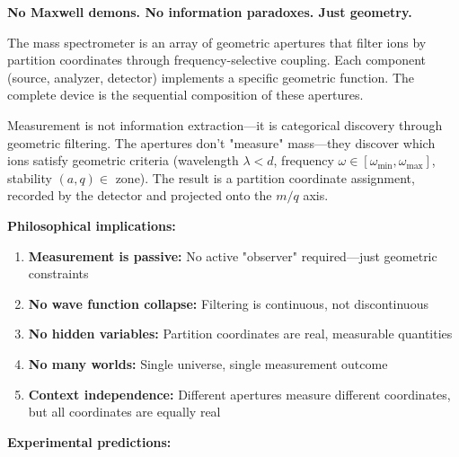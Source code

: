 \textbf{No Maxwell demons. No information paradoxes. Just geometry.}

The mass spectrometer is an array of geometric apertures that filter ions by partition coordinates through frequency-selective coupling. Each component (source, analyzer, detector) implements a specific geometric function. The complete device is the sequential composition of these apertures.

Measurement is not information extraction—it is categorical discovery through geometric filtering. The apertures don't "measure" mass—they discover which ions satisfy geometric criteria (wavelength $\lambda < d$, frequency $\omega \in [\omega_{\min}, \omega_{\max}]$, stability $(a,q) \in$ zone). The result is a partition coordinate assignment, recorded by the detector and projected onto the $m/q$ axis.

\textbf{Philosophical implications:}

\begin{enumerate}
    \item \textbf{Measurement is passive:} No active "observer" required—just geometric constraints

    \item \textbf{No wave function collapse:} Filtering is continuous, not discontinuous

    \item \textbf{No hidden variables:} Partition coordinates are real, measurable quantities

    \item \textbf{No many worlds:} Single universe, single measurement outcome

    \item \textbf{Context independence:} Different apertures measure different coordinates, but all coordinates are equally real
\end{enumerate}

\textbf{Experimental predictions:}


